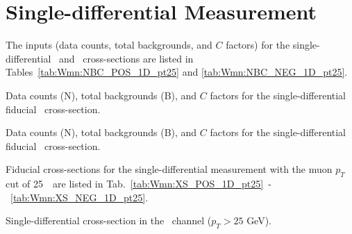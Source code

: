 \section{Single-differential Measurement}
The inputs (data counts, total backgrounds, and $C$ factors) for the single-differential \Wmunup\ and \Wmunum\ cross-sections are listed in Tables~\ref{tab:Wmn:NBC_POS_1D_pt25} and \ref{tab:Wmn:NBC_NEG_1D_pt25}.

\begin{table}[htbp]
\begin{center}

\caption{ Data counts (N), total backgrounds (B), and $C$ factors for the single-differential fiducial \Wmunup\ cross-section. \NBCexp}
\label{tab:Wmn:NBC_POS_1D_pt25}
\end{center}
\end{table}

\begin{table}[htbp]
\begin{center}

\caption{ Data counts (N), total backgrounds (B), and $C$ factors for the single-differential fiducial \Wmunum\ cross-section. \NBCexp}
\label{tab:Wmn:NBC_NEG_1D_pt25}
\end{center}
\end{table}


Fiducial cross-sections for the single-differential measurement with the muon $p_T$ cut of 25~\GeV\ are listed in Tab.~\ref{tab:Wmn:XS_POS_1D_pt25}~-~\ref{tab:Wmn:XS_NEG_1D_pt25}.

\begin{table}
\begin{center}

\caption{ Single-differential cross-section in the \Wmunup\ channel ($p_T>25$ GeV).}
\label{tab:Wmn:XS_POS_1D_pt25}
\end{center}
\end{table}

